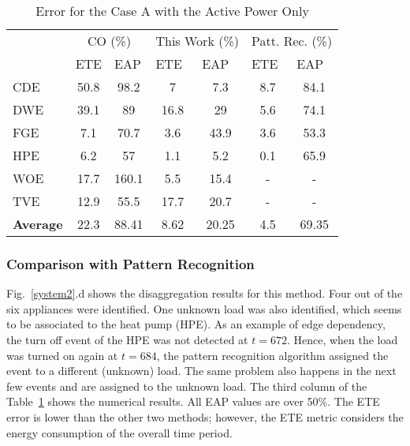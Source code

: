 \begin{table}[tb]
\centering
\caption{Error for the Case A with the Active Power Only}
\label{results}
\begin{tabular}{lcccccc}
\hline
    & \multicolumn{2}{c}{CO (\%)}                            & \multicolumn{2}{c}{This Work (\%)}                    & \multicolumn{2}{c}{Patt. Rec. (\%)}                     \\
    & \multicolumn{1}{l}{ETE} & \multicolumn{1}{l}{EAP} & \multicolumn{1}{l}{ETE} & \multicolumn{1}{l}{EAP} & \multicolumn{1}{l}{ETE} & \multicolumn{1}{l}{EAP} \\ \hline
CDE & 50.8                    & 98.2                   & 7                       & 7.3                     & 8.7                     & 84.1                    \\
DWE & 39.1                    & 89                    & 16.8                    & 29                    & 5.6                     & 74.1                    \\
FGE & 7.1                     & 70.7                    & 3.6                    & 43.9                    & 3.6                     & 53.3                    \\
HPE & 6.2                     & 57                    & 1.1                    & 5.2                    & 0.1                     & 65.9                    \\
WOE & 17.7                    & 160.1                   & 5.5                     & 15.4                    & -                       & -                       \\
TVE & 12.9                    & 55.5                    & 17.7                    & 20.7                    & -                       & -                       \\ \hline
\textbf{Average} & 22.3      & 88.41                    & 8.62                   & 20.25                   & 4.5                     & 69.35                   \\ \hline
\end{tabular}
\end{table}

\subsubsection{Comparison with Pattern Recognition}
Fig.~\ref{system2}.d shows the disaggregation results for this method. Four out of the six appliances were identified. One unknown load was also identified, which seems to be associated to the heat pump (HPE). As an example of edge dependency, the turn off event of the HPE was not detected at $t = 672$. Hence, when the load was turned on again at $t = 684$, the pattern recognition algorithm assigned the event to a different (unknown) load. The same problem also happens in the next few events and are assigned to the unknown load. The third column of the Table~\ref{results} shows the numerical results. All EAP values are over 50\%. The ETE error is lower than the other two methods; however, the ETE metric considers the energy consumption of the overall time period.

